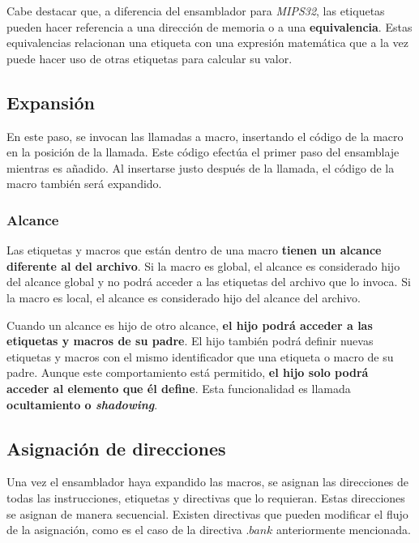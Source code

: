 Cabe destacar que, a diferencia del ensamblador para \textit{MIPS32},
las etiquetas pueden hacer referencia a una dirección de memoria
o a una \textbf{equivalencia}.
Estas equivalencias relacionan una etiqueta con una expresión matemática
que a la vez puede hacer uso de otras etiquetas para calcular su valor.

\subsection{Expansión}\label{subsec:expansion}

En este paso, se invocan las llamadas a macro,
insertando el código de la macro en la posición de la llamada.
Este código efectúa el primer paso del ensamblaje mientras es añadido.
Al insertarse justo después de la llamada, el código de la macro
también será expandido.

\subsubsection{Alcance}\label{subsubsec:alcance}

Las etiquetas y macros que están dentro de una macro
\textbf{tienen un alcance diferente al del archivo}.
Si la macro es global, el alcance es considerado hijo del alcance global
y no podrá acceder a las etiquetas del archivo que lo invoca.
Si la macro es local, el alcance es considerado hijo del alcance del archivo.

Cuando un alcance es hijo de otro alcance,
\textbf{el hijo podrá acceder a las etiquetas y macros de su padre}.
El hijo también podrá definir nuevas etiquetas y macros con el mismo
identificador que una etiqueta o macro de su padre.
Aunque este comportamiento está permitido, \textbf{el hijo solo podrá acceder
al elemento que él define}.
Esta funcionalidad es llamada \textbf{ocultamiento o \textit{shadowing}}.

\subsection{Asignación de direcciones}\label{subsec:asignacion-de-direcciones}

Una vez el ensamblador haya expandido las macros,
se asignan las direcciones de todas las instrucciones,
etiquetas y directivas que lo requieran.
Estas direcciones se asignan de manera secuencial.
Existen directivas que pueden modificar el flujo de la asignación,
como es el caso de la directiva $.bank$ anteriormente mencionada.

